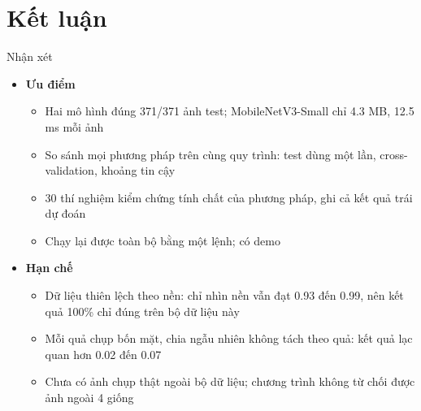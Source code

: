 \documentclass[aspectratio=169,10pt]{beamer}
\begin{document}
\section{Kết luận}
\begin{frame}{Nhận xét}
\begin{itemize}\small
\item \textbf{Ưu điểm}
\begin{itemize}
\item Hai mô hình đúng 371/371 ảnh test; MobileNetV3-Small chỉ 4.3 MB, 12.5 ms mỗi ảnh
\item So sánh mọi phương pháp trên cùng quy trình: test dùng một lần, cross-validation, khoảng tin cậy
\item 30 thí nghiệm kiểm chứng tính chất của phương pháp, ghi cả kết quả trái dự đoán
\item Chạy lại được toàn bộ bằng một lệnh; có demo
\end{itemize}
\item \textbf{Hạn chế}
\begin{itemize}
\item Dữ liệu thiên lệch theo nền: chỉ nhìn nền vẫn đạt 0.93 đến 0.99, nên kết quả 100\% chỉ đúng trên bộ dữ liệu này
\item Mỗi quả chụp bốn mặt, chia ngẫu nhiên không tách theo quả: kết quả lạc quan hơn 0.02 đến 0.07
\item Chưa có ảnh chụp thật ngoài bộ dữ liệu; chương trình không từ chối được ảnh ngoài 4 giống
\end{itemize}
\end{itemize}
\end{frame}
\end{document}
